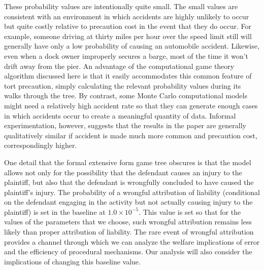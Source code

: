 \documentclass{article}
\begin{document}
These probability values are intentionally quite small. The small values are consistent with an environment in which accidents are highly unlikely to occur but quite costly relative to precaution cost in the event that they do occur. For example, someone driving at thirty miles per hour over the speed limit still will generally have only a low probability of causing an automobile accident. Likewise, even when a dock owner improperly secures a barge, most of the time it won't drift away from the pier. An advantage of the computational game theory algorithm discussed here is that it easily accommodates this common feature of tort precaution, simply calculating the relevant probability values during its walks through the tree. By contrast, some Monte Carlo computational models might need a relatively high accident rate so that they can generate enough cases in which accidents occur to create a meaningful quantity of data. Informal experimentation, however, suggests that the results in the paper are generally qualitatively similar if accident is made much more common and precaution cost, correspondingly higher.

One detail that the formal extensive form game tree obscures is that the model allows not only for the possibility that the defendant causes an injury to the plaintiff, but also that the defendant is wrongfully concluded to have caused the plaintiff's injury. The probability of a wrongful attribution of liability (conditional on the defendant engaging in the activity but not actually causing injury to the plaintiff) is set in the baseline at $1.0 \times 10^{-5}$. This value is set so that for the values of the parameters that we choose, such wrongful attribution remains less likely than proper attribution of liability. The rare event of wrongful attribution provides a channel through which we can analyze the welfare implications of error and the efficiency of procedural mechanisms. Our analysis will also consider the implications of changing this baseline value.
\end{document}
